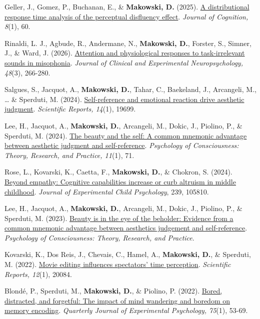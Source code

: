 \documentclass[11pt,a4paper,]{awesome-cv}
\begin{document}
\scriptsize

Geller, J., Gomez, P., Buchanan, E., \& \textbf{Makowski, D.} (2025).
\href{https://doi.org/10.5334/joc.469}{A distributional response time
analysis of the perceptual disfluency effect}. \emph{Journal of
Cognition, 8}(1), 60.

Rinaldi, L. J., Agbude, R., Andermane, N., \textbf{Makowski, D.},
Forster, S., Simner, J., \& Ward, J. (2026).
\href{https://doi.org/10.1080/13803395.2026.2633236}{Attention and
physiological responses to task-irrelevant sounds in misophonia}.
\emph{Journal of Clinical and Experimental Neuropsychology, 48}(3),
266-280.

Salgues, S., Jacquot, A., \textbf{Makowski, D.}, Tahar, C., Baekeland,
J., Arcangeli, M., \ldots{} \& Sperduti, M. (2024).
\href{https://www.nature.com/articles/s41598-024-68331-9}{Self-reference
and emotional reaction drive aesthetic judgment}. \emph{Scientific
Reports, 14}(1), 19699.

Lee, H., Jacquot, A., \textbf{Makowski, D.}, Arcangeli, M., Dokic, J.,
Piolino, P., \& Sperduti, M. (2024).
\href{https://doi.org/10.1037/cns0000345}{The beauty and the self: A
common mnemonic advantage between aesthetic judgment and
self-reference}. \emph{Psychology of Consciousness: Theory, Research,
and Practice, 11}(1), 71.

Rose, L., Kovarski, K., Caetta, F., \textbf{Makowski, D.}, \& Chokron,
S. (2024). \href{https://doi.org/10.1016/j.jecp.2023.105810}{Beyond
empathy: Cognitive capabilities increase or curb altruism in middle
childhood}. \emph{Journal of Experimental Child Psychology}, 239,
105810.

Lee, H., Jacquot, A., \textbf{Makowski, D.}, Arcangeli, M., Dokic, J.,
Piolino, P., \& Sperduti, M. (2023).
\href{https://dominiquemakowski.github.io/publication/lee2023beauty/lee2023beauty.pdf}{Beauty
is in the eye of the beholder: Evidence from a common mnemonic advantage
between aesthetics judgement and self-reference}. \emph{Psychology of
Consciousness: Theory, Research, and Practice}.

Kovarski, K., Dos Reis, J., Chevais, C., Hamel, A., \textbf{Makowski,
D.}, \& Sperduti, M. (2022).
\href{https://www.nature.com/articles/s41598-022-23992-2}{Movie editing
influences spectators' time perception}. \emph{Scientific Reports,
12}(1), 20084.

Blondé, P., Sperduti, M., \textbf{Makowski, D.}, \& Piolino, P. (2022).
\href{https://journals.sagepub.com/doi/abs/10.1177/17470218211026301}{Bored,
distracted, and forgetful: The impact of mind wandering and boredom on
memory encoding}. \emph{Quarterly Journal of Experimental Psychology,
75}(1), 53-69.
\end{document}
